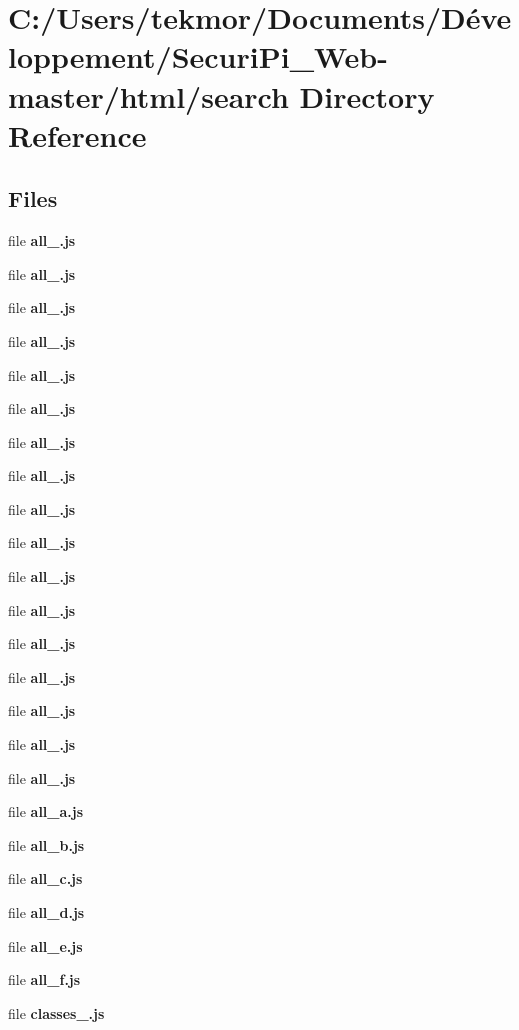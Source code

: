 \section{C\+:/\+Users/tekmor/\+Documents/\+Développement/\+Securi\+Pi\+\_\+\+Web-\/master/html/search Directory Reference}
\label{dir_a18e76caac740f6091301e484e2086a7}
\subsection*{Files}
\begin{DoxyCompactItemize}
\item 
file {\bf all\+\_.\+js}
\item 
file {\bf all\+\_.\+js}
\item 
file {\bf all\+\_.\+js}
\item 
file {\bf all\+\_.\+js}
\item 
file {\bf all\+\_.\+js}
\item 
file {\bf all\+\_.\+js}
\item 
file {\bf all\+\_.\+js}
\item 
file {\bf all\+\_.\+js}
\item 
file {\bf all\+\_.\+js}
\item 
file {\bf all\+\_.\+js}
\item 
file {\bf all\+\_.\+js}
\item 
file {\bf all\+\_.\+js}
\item 
file {\bf all\+\_.\+js}
\item 
file {\bf all\+\_.\+js}
\item 
file {\bf all\+\_.\+js}
\item 
file {\bf all\+\_.\+js}
\item 
file {\bf all\+\_.\+js}
\item 
file {\bf all\+\_\+a.\+js}
\item 
file {\bf all\+\_\+b.\+js}
\item 
file {\bf all\+\_\+c.\+js}
\item 
file {\bf all\+\_\+d.\+js}
\item 
file {\bf all\+\_\+e.\+js}
\item 
file {\bf all\+\_\+f.\+js}
\item 
file {\bf classes\+\_.\+js}
\item 

\end{DoxyCompactItemize}
